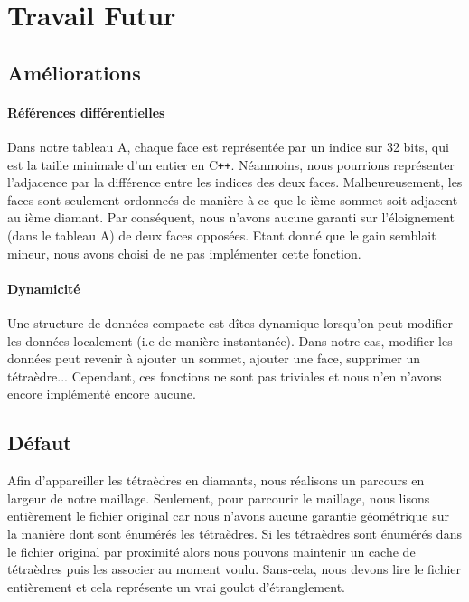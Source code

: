 \section{Travail Futur}
\subsection{Améliorations}
\paragraph{Références différentielles}
Dans notre tableau A, chaque face est représentée par un indice sur 32 bits, qui est la taille minimale d'un entier en C\texttt{++}. Néanmoins, nous pourrions représenter l'adjacence par la différence entre les indices des deux faces. Malheureusement, les faces sont seulement ordonneés de manière à ce que le ième sommet soit adjacent au ième diamant. Par conséquent, nous n'avons aucune garanti sur l'éloignement (dans le tableau A) de deux faces opposées. Etant donné que le gain semblait mineur, nous avons choisi de ne pas implémenter cette fonction.

\paragraph{Dynamicité}
Une structure de données compacte est dîtes dynamique lorsqu'on peut modifier les données localement (i.e de manière instantanée). Dans notre cas, modifier les données peut revenir à ajouter un sommet, ajouter une face, supprimer un tétraèdre... Cependant, ces fonctions ne sont pas triviales et nous n'en n'avons encore implémenté encore aucune.

\subsection{Défaut}
\noindent
Afin d'appareiller les tétraèdres en diamants, nous réalisons un parcours en largeur de notre maillage. Seulement, pour parcourir le maillage, nous lisons entièrement le fichier original car nous n'avons aucune garantie géométrique sur la manière dont sont énumérés les tétraèdres. Si les tétraèdres sont énumérés dans le fichier original par proximité alors nous pouvons maintenir un cache de tétraèdres puis les associer au moment voulu. Sans-cela, nous devons lire le fichier entièrement et cela représente un vrai goulot d'étranglement.


